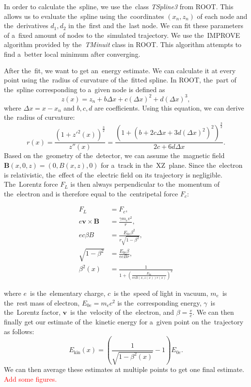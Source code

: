 		In order to calculate the~spline, we use the~class \textit{TSpline3} from ROOT. This allows us to evaluate the~spline using the~coordinates $(x_n,z_n)$ of each node and the~derivatives $d_1,d_2$ in the~first and the~last node. We can fit these parameters of a~fixed amount of nodes to the~simulated trajectory. We use the~IMPROVE algorithm provided by the~\textit{TMinuit} class in ROOT. This algorithm attempts to find a~better local minimum after converging.
		
		After the~fit, we want to get an~energy estimate. We can calculate it at every point using the~radius of curvature of the~fitted spline. In ROOT, the~part of the~spline corresponding to a~given node is defined as
			\begin{equation}
				z(x) = z_n + b \Delta x+c(\Delta x)^2+d(\Delta x)^3,
			\end{equation}
		where $\Delta x = x-x_n$ and $b,c,d$ are coefficients. Using this equation, we can derive the~radius of curvature:
			\begin{equation}
				r(x) = \frac{\left(1+z'^2(x)\right)^\frac{3}{2}}{z''(x)} = \frac{\left(1+\left(b+2c\Delta x+3d(\Delta x)^2\right)^2\right)^\frac{3}{2}}{2c+6d\Delta x}.
			\end{equation}
		Based on the~geometry of the~detector, we can assume the~magnetic field \linebreak$\bm{B}(x,0,z) = (0,B(x,z),0)$ for a~track in the~XZ~plane. Since the~electron is relativistic, the~effect of the~electric field on its trajectory is negligible. The~Lorentz force $F_L$ is then always perpendicular to the~momentum of the~electron and is therefore equal to the~centripetal force $F_c$:
			\begin{linenomath}
			\begin{align}
				F_L &= F_c,\\
				e\bm{v}\times\bm{B} &= \frac{\gamma m_e v^2}{r},\\
				e c\beta B &= \frac{E_{0e} \beta^2}{r\sqrt{1-\beta^2}},\\
				\sqrt{1-\beta^2} &= \frac{E_{0e} \beta}{ecBr},\\
				\beta^2(x) &= \frac{1}{1+\left(\frac{E_{0e}}{ecB(x,z(x))r(x)}\right)^2} \label{eq:ekin1}
			\end{align}
			\end{linenomath}
		where $e$~is the~elementary charge, $c$~is the~speed of light in vacuum, $m_e$~is the~rest mass of electron, $E_{0e} = m_e c^2$ is the~corresponding energy, $\gamma$~is the~Lorentz factor, $\bm{v}$~is the~velocity of the~electron, and $\beta = \frac{v}{c}$. We can then finally get our estimate of the~kinetic energy for a~given point on the~trajectory as follows:
			\begin{equation}
				\label{eq:ekin2}
				E_\text{kin}(x) = \left(\frac{1}{\sqrt{1-\beta^2(x)}}-1\right)E_{0e}.
			\end{equation}
		We can then average these estimates at multiple points to get one final estimate.
		\textcolor{red}{Add some figures.}
		
